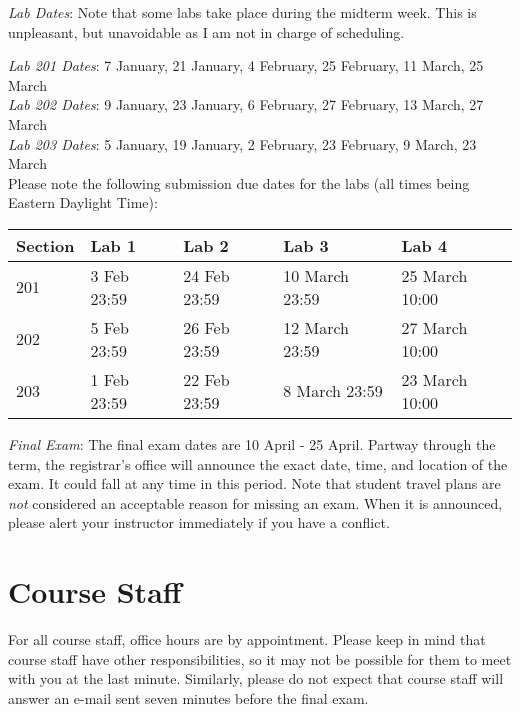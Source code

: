 \documentclass[letterpaper,10pt]{article}
\begin{document}
\textit{Lab Dates}: Note that some labs take place during the midterm week. This is unpleasant, but unavoidable as I am not in charge of scheduling.

\textit{Lab 201 Dates}: 7 January, 21 January, 4 February, 25 February, 11 March, 25 March\\
\textit{Lab 202 Dates}: 9 January, 23 January, 6 February, 27 February, 13 March, 27 March\\
\textit{Lab 203 Dates}: 5 January, 19 January, 2 February, 23 February, 9 March, 23 March\\


Please note the following submission due dates for the labs (all times being Eastern Daylight Time):\\

\begin{table}[h]
        \begin{center}
        \begin{tabular}{l|l|l|l|l}
        	\textbf{Section} & \textbf{Lab 1} & \textbf{Lab 2} & \textbf{Lab 3} & \textbf{Lab 4} \\
			\hline
			201 & 3 Feb 23:59 & 24 Feb 23:59 & 10 March 23:59 & 25 March 10:00 \\
			\hline
			202 & 5 Feb 23:59 & 26 Feb 23:59 & 12 March 23:59 & 27 March 10:00 \\
			\hline
			203 & 1 Feb 23:59 & 22 Feb 23:59 & 8 March 23:59 & 23 March 10:00 \\
        \end{tabular}
        \end{center}
\end{table}

\textit{Final Exam}: The final exam dates are 10 April - 25 April. Partway through the term, the registrar's office will announce the exact date, time, and location of the exam. It could fall at any time in this period. Note that student travel plans are \emph{not} considered an acceptable reason for missing an exam. When it is announced, please alert your instructor immediately if you have a conflict.

\section*{Course Staff}

For all course staff, office hours are by appointment. Please keep in mind that course staff have other responsibilities, so it may not be possible for them to meet with you at the last minute. Similarly, please do not expect that course staff will answer an e-mail sent seven minutes before the final exam.
\end{document}
